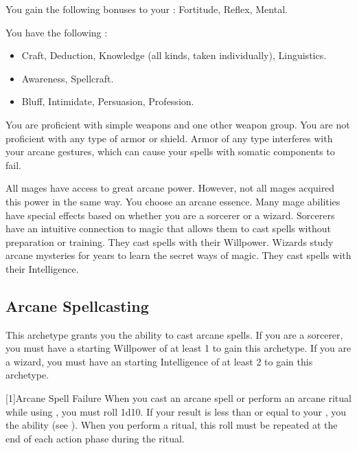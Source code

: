         You gain the following bonuses to your :  Fortitude,  Reflex,  Mental.

        You have the following :
        \begin{itemize}
            \item {} Craft, Deduction, Knowledge (all kinds, taken individually), Linguistics.
            \item {} Awareness, Spellcraft.
            \item {} Bluff, Intimidate, Persuasion, Profession.
        \end{itemize}

        You are proficient with simple weapons and one other weapon group.
        You are not proficient with any type of armor or shield.
        Armor of any type interferes with your arcane gestures, which can cause your spells with somatic components to fail.

        All mages have access to great arcane power.
        However, not all mages acquired this power in the same way.
        You choose an arcane essence.
        Many mage abilities have special effects based on whether you are a sorcerer or a wizard.
         Sorcerers have an intuitive connection to magic that allows them to cast spells without preparation or training.
        They cast spells with their Willpower.
         Wizards study arcane mysteries for years to learn the secret ways of magic.
        They cast spells with their Intelligence.

    \subsection{Arcane Spellcasting}
        This archetype grants you the ability to cast arcane spells.
        If you are a sorcerer, you must have a starting Willpower of at least 1 to gain this archetype.
        If you are a wizard, you must have an starting Intelligence of at least 2 to gain this archetype.

        [1]{Arcane Spell Failure}
        When you cast an arcane spell or perform an arcane ritual while using , you must roll 1d10.
        If your result is less than or equal to your , you  the ability (see ).
        When you perform a ritual, this roll must be repeated at the end of each action phase during the ritual.

